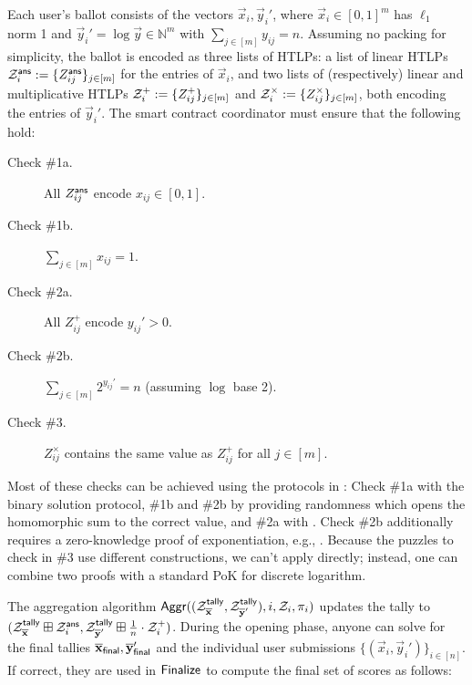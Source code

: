 Each user's ballot consists of the vectors $\vec{x}_i, \vec{y}_i'$, where $\vec{x}_i \in [0,1]^m$ has $\ell_1$ norm 1 and $\vec{y}_i' = \log{\vec{y}} \in \mathbb{N}^m$ with $\sum_{j \in [m]} y_{ij} = n$. Assuming no packing for simplicity, the ballot is encoded as three lists of HTLPs: a list of linear HTLPs $\mathcal{Z}_i^{\sf ans} := \{Z_{ij}^{\sf ans}\}_{j \in [m]}$ for the entries of $\vec{x}_i$, and two lists of (respectively) linear and multiplicative HTLPs $\mathcal{Z}_i^{+} := \{Z_{ij}^{+}\}_{j \in [m]}$ and $\mathcal{Z}_i^{\times} := \{Z_{ij}^{\times}\}_{j \in [m]}$, both encoding the entries of $\vec{y}_i'$. The smart contract coordinator must ensure that the following hold:
\begin{description}
    \item[Check \#1a.] All $Z_{ij}^{\sf ans}$ encode $x_{ij} \in [0,1]$.
    \item[Check \#1b.] $\sum_{j \in [m]} x_{ij} = 1$.
    \item[Check \#2a.] All $Z_{ij}^{+}$ encode $y_{ij}' > 0$.
    \item[Check \#2b.] $\sum_{j \in [m]} 2^{y_{ij}'} = n$ (assuming $\log$ base 2).
    \item[Check \#3.] $Z_{ij}^{\times}$ contains the same value as $Z_{ij}^{+}$ for all $j \in [m]$.
\end{description}

Most of these checks can be achieved using the protocols in : Check \#1a with the binary solution protocol, \#1b and \#2b by providing randomness which opens the homomorphic sum to the correct value, and \#2a with \zkpopos. Check \#2b additionally requires a zero-knowledge proof of exponentiation, e.g., \cite{C:BonBunFis19}. Because the puzzles to check in \#3 use different constructions, we can't apply \zkposeq directly; instead, one can combine two \zkpoks proofs with a standard PoK for discrete logarithm.

The aggregation algorithm $\mathsf{Aggr}((\mathcal{Z}_{\overline{\mathbf{x}}}^{\sf tally}, \mathcal{Z}_{\overline{\mathbf{y}}'}^{\sf tally}), i, \mathcal{Z}_i, \pi_i)$ updates the tally to $(\mathcal{Z}_{\overline{\mathbf{x}}}^{\sf tally} \boxplus \mathcal{Z}_i^{\sf ans}, \mathcal{Z}_{\overline{\mathbf{y}}'}^{\sf tally} \boxplus \frac{1}{n} \cdot \mathcal{Z}_i^{+})$. During the opening phase, anyone can solve for the final tallies $\overline{\mathbf{x}}_{\sf final}, \overline{\mathbf{y}}'_{\sf final}$ and the individual user submissions $\{(\vec{x}_i, \vec{y}_i')\}_{i \in [n]}$. If correct, they are used in $\mathsf{Finalize}$ to compute the final set of scores as follows:

